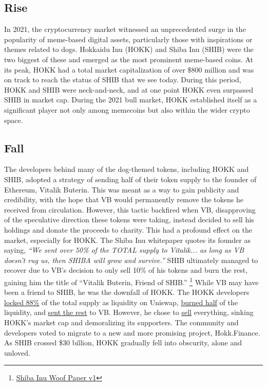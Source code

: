 \documentclass{article}
\begin{document}
\subsection{Rise}
In 2021, the cryptocurrency market witnessed an unprecedented surge in the popularity of meme-based digital assets, particularly those with inspirations or themes related to dogs. Hokkaidu Inu (HOKK) and Shiba Inu (SHIB) were the two biggest of these and emerged as the most prominent meme-based coins. At its peak, HOKK had a total market capitalization of over \$800 million and was on track to reach the status of SHIB that we see today. During this period, HOKK and SHIB were neck-and-neck, and at one point HOKK even surpassed SHIB in market cap. During the 2021 bull market, HOKK established itself as a significant player not only among memecoins but also within the wider crypto space.

\subsection{Fall}
The developers behind many of the dog-themed tokens, including HOKK and SHIB, adopted a strategy of sending half of their token supply to the founder of Ethereum, Vitalik Buterin. This was meant as a way to gain publicity and credibility, with the hope that VB would permanently remove the tokens he received from circulation. However, this tactic backfired when VB, disapproving of the speculative direction these tokens were taking, instead decided to sell his holdings and donate the proceeds to charity. This had a profound effect on the market, especially for HOKK. The Shiba Inu whitepaper quotes its founder as saying, \textit{``We sent over 50\% of the TOTAL supply to Vitalik... as long as VB doesn't rug us, then SHIBA will grow and survive.''} SHIB ultimately managed to recover due to VB's decision to only sell 10\% of his tokens and burn the rest, gaining him the title of ``Vitalik Buterin, Friend of SHIB.'' \footnote{\href{http://web.archive.org/web/20230325143227/https://shibatoken.com/assets/files/SHIBA_INU_WOOF_PAPER_V1-be8dfc380016e7dd95276ca12efb07bb.pdf}{Shiba Inu Woof Paper v1}} While VB may have been a friend to SHIB, he was the downfall of HOKK. The HOKK developers \href{https://etherscan.io/tx/0x402a19a27edb828deed9c6e5dfcd3f755fe9a6f5de7e0003258fe5a474168cfd}{locked 88\%} of the total supply as liquidity on Uniswap, \href{https://etherscan.io/tx/0x7e564274825e0e48cd4dcef21312d56a98471e9b84861c0180489bf54d693137}{burned half} of the liquidity, and \href{https://etherscan.io/tx/0x75bfa9f7cf1b17b486c936ef0d172d03667e037986682b36beb7fef07f043b86}{sent the rest} to VB. However, he chose to \href{https://etherscan.io/tx/0x0534c7764e7461c15b2b589144237ce5572a618d9cafb4c397b1ee3fe64411ac}{sell} everything, sinking HOKK's market cap and demoralizing its supporters. The community and developers voted to migrate to a new and more promising project, Hokk.Finance. As SHIB crossed \$30 billion, HOKK gradually fell into obscurity, alone and unloved.
\end{document}
